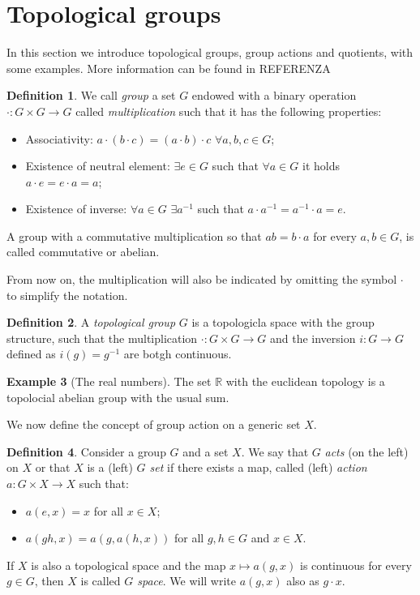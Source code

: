 \documentclass[12pt,a4paper]{report}
\theoremstyle{definition}
\newtheorem{Def}{Definition}[chapter]
\theoremstyle{Theorem}
\theoremstyle{definition}
\newtheorem{Ex}[Def]{Example}
\theoremstyle{definition}
\begin{document}
		\section{Topological groups}
		In this section we introduce topological groups, group actions and quotients, with some examples. More information can be found in REFERENZA
		\begin{Def}
			We call \textit{group} a set $G$ endowed with a binary operation $\cdot:G\times G\rightarrow G$ called \textit{multiplication} such that it has the following properties:
			\begin{itemize}
				\item Associativity: $a\cdot (b\cdot c)=(a\cdot b)\cdot c$ $\forall a,b,c\in G$;
				\item Existence of neutral element: $\exists e\in G$ such that $\forall a\in G$ it holds $a\cdot e=e\cdot a=a$;
				\item Existence of inverse: $\forall a\in G$ $\exists a^{-1}$ such that $a\cdot a^{-1}=a^{-1}\cdot a=e$.
			\end{itemize}
			A group with a commutative multiplication so that $ab= b\cdot a$ for every $a,b\in G$, is called commutative or abelian.
		\end{Def}
		From now on, the multiplication will also be indicated by omitting the symbol $\cdot$ to simplify the notation.
		\begin{Def}
			A \textit{topological group} $G$ is a topologicla space with the group structure, such that the multiplication $\cdot:G\times G\rightarrow G$ and the inversion $i:G\rightarrow G$ defined as $i(g)=g^{-1}$ are botgh continuous.
		\end{Def}
		\begin{Ex}[The real numbers]
			The set $\mathbb{R}$ with the euclidean topology is a topolocial abelian group with the usual sum.
		\end{Ex}
		We now define the concept of group action on a generic set $X$.
		\begin{Def}
			Consider a group $G$ and a set $X$. We say that $G$ \textit{acts} (on the left) on $X$ or that $X$ is a (left) \textit{$G$ set} if there exists a map, called (left) \textit{action} $a:G\times X\rightarrow X$ such that:
			\begin{itemize}
				\item 	$a(e,x)=x$ for all $x\in X$;
				\item $a(gh,x)=a(g,a(h,x))$ for all $g,h\in G$ and $x\in X$.
			\end{itemize} 
			If $X$ is also a topological space and the map $x\longmapsto a(g,x)$ is continuous for every $g\in G$, then $X$ is called \textit{$G$ space}.
			We will write $a(g,x)$ also as $g\cdot x$.
		\end{Def}
\end{document}
